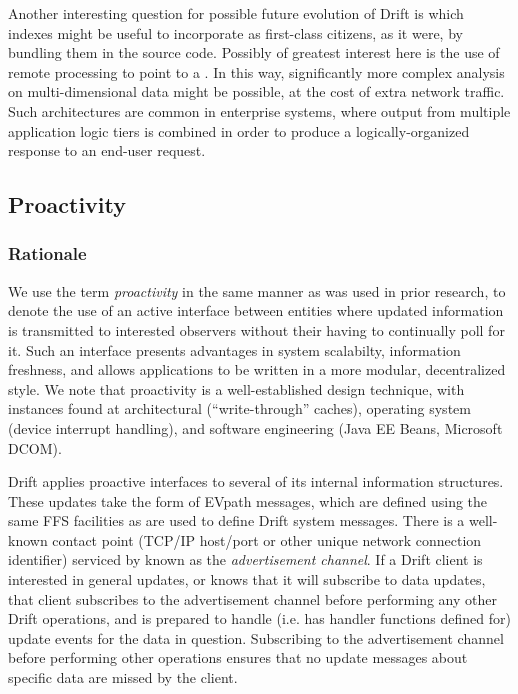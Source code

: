 Another interesting question for possible future evolution of Drift is which indexes might be useful to
incorporate as first-class citizens, as it were, by bundling them in the source code.  Possibly of
greatest interest here is the use of remote processing to point to a \dpart.  In this way, significantly
more complex analysis on multi-dimensional data might be possible, at the cost of extra network traffic.
Such architectures are common in enterprise systems, where output from multiple application logic tiers
is combined in order to produce a logically-organized response to an end-user request.  


\subsection{Proactivity}
\label{sec:proactivity}

\subsubsection{Rationale}

We use the term \emph{proactivity} in the same manner as was used in prior
research\cite{bustamante02:_scalab_direc_servic_using_proac}, to denote the use of an active interface
between entities where updated information is transmitted to interested observers without their having to
continually poll for it.  Such an interface presents advantages in system scalabilty, information
freshness, and allows applications to be written in a more modular, decentralized style.  We note that
proactivity is a well-established design technique, with instances found at architectural
(``write-through'' caches), operating system (device interrupt handling), and software engineering (Java
EE Beans, Microsoft DCOM).  

Drift applies proactive interfaces to several of its internal information structures.  These updates take
the form of EVpath messages, which are defined using the same FFS facilities as are used to define Drift
system messages.  There is a well-known contact point (TCP/IP host/port or other unique
network connection identifier) serviced by \driftd known as the \emph{advertisement channel}.  If a Drift
client is interested in general \driftd updates, or knows that it will subscribe to data updates, that
client subscribes to the advertisement channel before performing any other Drift operations, and is
prepared to handle (i.e. has handler functions defined for) update events for the data in question.
Subscribing to the advertisement channel before performing other operations ensures that no update
messages about specific data are missed by the client.  

